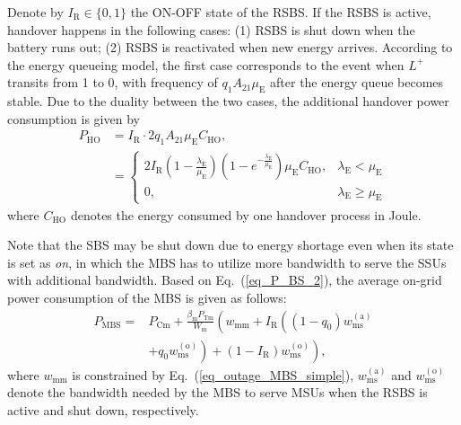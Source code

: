 \documentclass[12pt, draftclsnofoot,onecolumn]{IEEEtran}
\begin{document}
Denote by $I_\mathrm{R} \in \{0,1\}$ the ON-OFF state of the RSBS.
If the RSBS is active, handover happens in the following cases: (1) RSBS is shut down when the battery runs out; (2) RSBS is reactivated when new energy arrives.
According to the energy queueing model, the first case corresponds to the event when $L^+$ transits from 1 to 0, with frequency of $q_1 A_{21} \mu_\mathrm{E}$ after the energy queue becomes stable.
Due to the duality between the two cases, the additional handover power consumption is given by
\begin{equation}\label{eq_RSBS_switching}
    \begin{split}
    P_\mathrm{HO} & =  I_\mathrm{R} \cdot 2 q_1 A_{21} \mu_\mathrm{E} C_\mathrm{HO}, \\
    & = \left\{ \begin{array}{ll}  2 I_\mathrm{R} (1-\frac{\lambda_\mathrm{E}}{\mu_\mathrm{E}})\left(1-e^{-\frac{\lambda_\mathrm{E}}{\mu_\mathrm{E}}}\right) \mu_\mathrm{E} C_\mathrm{HO}, & \lambda_\mathrm{E} < \mu_\mathrm{E} \\
    0, & \lambda_\mathrm{E} \geq \mu_\mathrm{E} \end{array} \right.
    \end{split}
\end{equation}
where $C_\mathrm{HO}$ denotes the energy consumed by one handover process in Joule.

Note that the SBS may be shut down due to energy shortage even when its state is set as \emph{on}, in which the MBS has to utilize more bandwidth to serve the SSUs with additional bandwidth.
Based on Eq.~(\ref{eq_P_BS_2}), the average on-grid power consumption of the MBS is given as follows:
\begin{equation}\label{eq_P_mbs_RSBS_on}
	\begin{split}
	    P_\mathrm{MBS} = &  P_{\mathrm{Cm}} + \frac{\beta_\mathrm{m}P_\mathrm{Tm}}{W_\mathrm{m}} \left(w_\mathrm{mm} + I_\mathrm{R} \left( (1-q_0) w_\mathrm{ms}^{(\mathrm{a})}  \right. \right.\\
	    & \left. \left. + q_0 w_\mathrm{ms}^{(\mathrm{o})} \right)  + (1-I_\mathrm{R}) w_\mathrm{ms}^{(\mathrm{o})} \right),
    \end{split}
\end{equation}
where $w_\mathrm{mm}$ is constrained by Eq.~(\ref{eq_outage_MBS_simple}), $w_\mathrm{ms}^{(\mathrm{a})}$ and $w_\mathrm{ms}^{(\mathrm{o})}$ denote the bandwidth needed by the MBS to serve MSUs when the RSBS is active and shut down, respectively.
\end{document}
